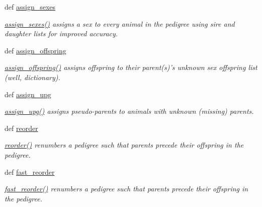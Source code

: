 \begin{CompactItemize}
def \hyperlink{namespacePyPedal_1_1pyp__utils_908a3b69336ce99ac8061998f4bba00f}{assign\_\-sexes}
\begin{CompactList}\small\item\em \hyperlink{namespacePyPedal_1_1pyp__utils_908a3b69336ce99ac8061998f4bba00f}{assign\_\-sexes()} assigns a sex to every animal in the pedigree using sire and daughter lists for improved accuracy. \item\end{CompactList}\item 
def \hyperlink{namespacePyPedal_1_1pyp__utils_c7e563808824c6680acff02146552cc4}{assign\_\-offspring}
\begin{CompactList}\small\item\em \hyperlink{namespacePyPedal_1_1pyp__utils_c7e563808824c6680acff02146552cc4}{assign\_\-offspring()} assigns offspring to their parent(s)'s unknown sex offspring list (well, dictionary). \item\end{CompactList}\item 
def \hyperlink{namespacePyPedal_1_1pyp__utils_2d706d1ee358934a0576de030b9d56ac}{assign\_\-upg}
\begin{CompactList}\small\item\em \hyperlink{namespacePyPedal_1_1pyp__utils_2d706d1ee358934a0576de030b9d56ac}{assign\_\-upg()} assigns pseudo-parents to animals with unknown (missing) parents. \item\end{CompactList}\item 
def \hyperlink{namespacePyPedal_1_1pyp__utils_4f2970c4e64c0d473968daf16237536d}{reorder}
\begin{CompactList}\small\item\em \hyperlink{namespacePyPedal_1_1pyp__utils_4f2970c4e64c0d473968daf16237536d}{reorder()} renumbers a pedigree such that parents precede their offspring in the pedigree. \item\end{CompactList}\item 
def \hyperlink{namespacePyPedal_1_1pyp__utils_2e16f737b56be8e4ab5ce5103a36644c}{fast\_\-reorder}
\begin{CompactList}\small\item\em \hyperlink{namespacePyPedal_1_1pyp__utils_2e16f737b56be8e4ab5ce5103a36644c}{fast\_\-reorder()} renumbers a pedigree such that parents precede their offspring in the pedigree. \item\end{CompactList}\item 

\end{CompactItemize}

